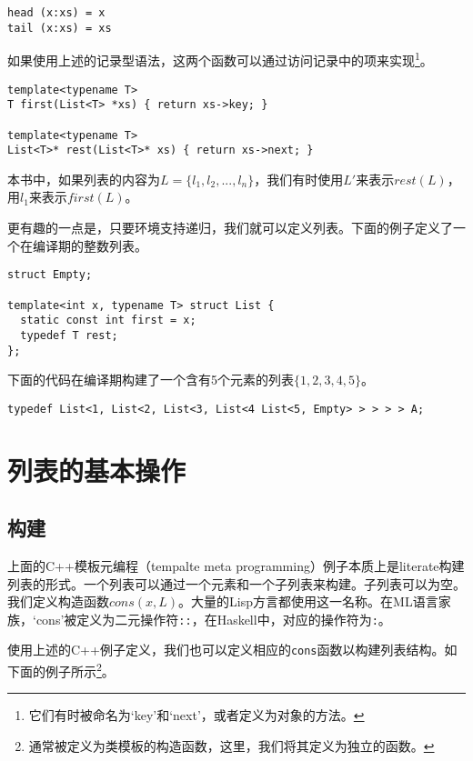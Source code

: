 \documentclass[UTF8]{article}
\begin{document}
\lstset{language=Haskell}
\begin{lstlisting}
head (x:xs) = x
tail (x:xs) = xs
\end{lstlisting}

如果使用上述的记录型语法，这两个函数可以通过访问记录中的项来实现\footnote{它们有时被命名为‘key’和‘next’，或者定义为对象的方法。}。

\lstset{language=C++}
\begin{lstlisting}
template<typename T>
T first(List<T> *xs) { return xs->key; }

template<typename T>
List<T>* rest(List<T>* xs) { return xs->next; }
\end{lstlisting}

本书中，如果列表的内容为$L = \{ l_1, l_2, ..., l_n\}$，我们有时使用$L'$来表示$rest(L)$，用$l_1$来表示$first(L)$。

更有趣的一点是，只要环境支持递归，我们就可以定义列表。下面的例子定义了一个在编译期的整数列表。

\lstset{language=C++}
\begin{lstlisting}
struct Empty;

template<int x, typename T> struct List {
  static const int first = x;
  typedef T rest;
};
\end{lstlisting}

下面的代码在编译期构建了一个含有5个元素的列表$\{1, 2, 3, 4, 5\}$。

\begin{lstlisting}
typedef List<1, List<2, List<3, List<4 List<5, Empty> > > > > A;
\end{lstlisting}

\section{列表的基本操作}

\subsection{构建}

上面的C++模板元编程（tempalte meta programming）例子本质上是literate构建列表的形式。一个列表可以通过一个元素和一个子列表来构建。子列表可以为空。我们定义构造函数$cons(x, L)$。大量的Lisp方言都使用这一名称。在ML语言家族，‘cons’被定义为二元操作符\texttt{::}，在Haskell中，对应的操作符为\texttt{:}。

使用上述的C++例子定义，我们也可以定义相应的\texttt{cons}函数以构建列表结构。如下面的例子所示\footnote{通常被定义为类模板的构造函数，这里，我们将其定义为独立的函数。}。
\end{document}
